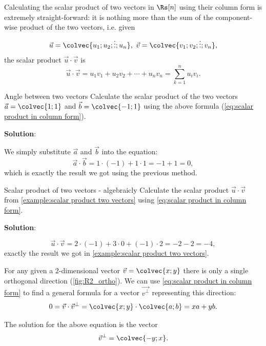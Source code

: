 Calculating the scalar product of two vectors in $\Rs[n]$ using their column form is extremely straight-forward: it is nothing more than the sum of the component-wise product of the two vectors, i.e. given
\[
	\vec{u}=\colvec{u_{1};u_{2};\vdots;u_{n}},\ \vec{v}=\colvec{v_{1};v_{2};\vdots;v_{n}},
\]
the scalar product $\vec{u}\cdot\vec{v}$ is
\begin{equation}
	\vec{u}\cdot\vec{v} = u_{1}v_{1} + u_{2}v_{2} + \cdots + u_{n}v_{n} = \sum\limits_{k=1}^{n}u_{i}v_{i}.
	\label{eq:scalar product in column form}
\end{equation}

\begin{example}{Angle between two vectors}{}
	Calculate the scalar product of the two vectors $\vec{a}=\colvec{1;1}$ and $\vec{b}=\colvec{-1;1}$ using the above formula (\autoref{eq:scalar product in column form}).

	\vspace{1em}
	\textbf{Solution}:
	
	We simply substitute $\vec{a}$ and $\vec{b}$ into the equation:
	\[
		\vec{a}\cdot\vec{b} = 1\cdot(-1) + 1\cdot1 = -1+1 = 0,
	\]
	which is exactly the result we got using the previous method.
\end{example}

\begin{example}{Scalar product of two vectors - algebraicly}{}
	Calculate the scalar product $\vec{u}\cdot\vec{v}$ from \autoref{example:scalar product two vectors} using \autoref{eq:scalar product in column form}.

	\vspace{1em}
	\textbf{Solution}:

	\[
		\vec{u}\cdot\vec{v} = 2\cdot(-1) + 3\cdot0 + (-1)\cdot2 = -2-2 = -4,
	\]
	exactly the result we got in \autoref{example:scalar product two vectors}.
\end{example}

For any given a $2$-dimensional vector $\vec{v}=\colvec{x;y}$ there is only a single orthogonal direction (\autoref{fig:R2_ortho}). We can use \autoref{eq:scalar product in column form} to find a general formula for a vector $\vec{v^{\perp}}$ representing this direction:
\[
	0 = \vec{v}\cdot\vec{v}^{\perp} = \colvec{x;y}\cdot\colvec{a;b} = xa + yb.
\]

The solution for the above equation is the vector
\begin{equation}
	\vec{v}^{\perp} = \colvec{-y;x}.
	\label{eq:ortho_vec_R2}
\end{equation}

